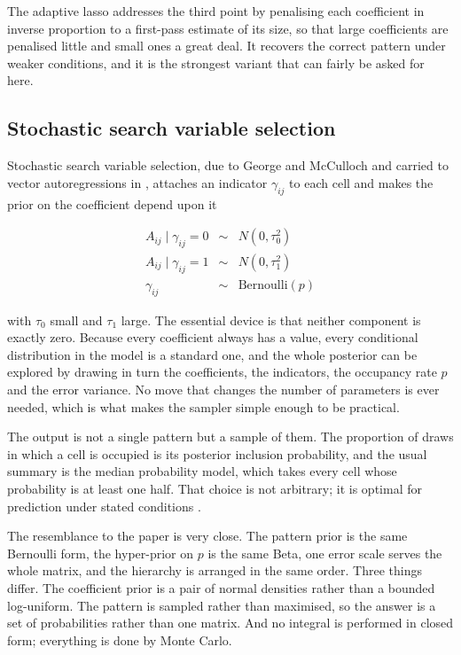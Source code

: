 The adaptive lasso \cite{zou2006} addresses the third point by penalising each
coefficient in inverse proportion to a first-pass estimate of its size, so that
large coefficients are penalised little and small ones a great deal. It recovers
the correct pattern under weaker conditions, and it is the strongest variant that
can fairly be asked for here.

\subsection{Stochastic search variable selection}
\label{sec:ssvs}

Stochastic search variable selection, due to George and McCulloch and carried to
vector autoregressions in \cite{gsn2008}, attaches an indicator $\gamma_{ij}$ to
each cell and makes the prior on the coefficient depend upon it

\begin{eqnarray}
A_{ij} \mid \gamma_{ij} = 0 &\sim& N(0, \tau_{0}^{2})
\label{eq:ssvs_A}
\\
A_{ij} \mid \gamma_{ij} = 1 &\sim& N(0, \tau_{1}^{2})
\label{eq:ssvs_B}
\\
\gamma_{ij} &\sim& \mathrm{Bernoulli}(p)
\label{eq:ssvs_C}
\end{eqnarray}

with $\tau_{0}$ small and $\tau_{1}$ large. The essential device is that neither
component is exactly zero. Because every coefficient always has a value, every
conditional distribution in the model is a standard one, and the whole posterior
can be explored by drawing in turn the coefficients, the indicators, the occupancy
rate $p$ and the error variance. No move that changes the number of parameters is
ever needed, which is what makes the sampler simple enough to be practical.

The output is not a single pattern but a sample of them. The proportion of draws in
which a cell is occupied is its posterior inclusion probability, and the usual
summary is the median probability model, which takes every cell whose probability
is at least one half. That choice is not arbitrary; it is optimal for prediction
under stated conditions \cite{barbieri2004}.

The resemblance to the paper is very close. The pattern prior is the same Bernoulli
form, the hyper-prior on $p$ is the same Beta, one error scale serves the whole
matrix, and the hierarchy is arranged in the same order. Three things differ. The
coefficient prior is a pair of normal densities rather than a bounded log-uniform.
The pattern is sampled rather than maximised, so the answer is a set of
probabilities rather than one matrix. And no integral is performed in closed form;
everything is done by Monte Carlo.

